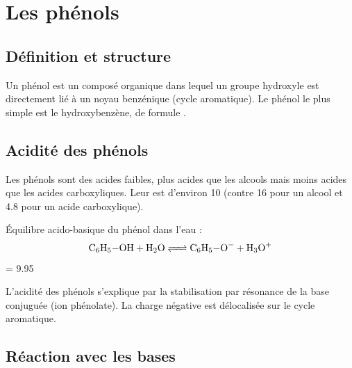 \section{Les phénols}

\subsection{Définition et structure}

\begin{definition}[Phénol]
Un phénol est un composé organique dans lequel un groupe hydroxyle  est directement lié à un noyau benzénique (cycle aromatique). Le phénol le plus simple est le hydroxybenzène, de formule .
\end{definition}

\begin{illus}
\end{illus}

\subsection{Acidité des phénols}

\begin{propriete}
Les phénols sont des acides faibles, plus acides que les alcools mais moins acides que les acides carboxyliques. Leur  est d'environ \num{10} (contre \num{16} pour un alcool et \num{4.8} pour un acide carboxylique).
\end{propriete}

\begin{exemple}
Équilibre acido-basique du phénol dans l'eau :
\[\ce{C6H5-OH + H2O <=> C6H5-O- + H3O+}\]
 = \num{9.95}
\end{exemple}

\begin{remarque}
L'acidité des phénols s'explique par la stabilisation par résonance de la base conjuguée (ion phénolate). La charge négative est délocalisée sur le cycle aromatique.
\end{remarque}

\begin{illus}
\end{illus}

\subsection{Réaction avec les bases}

